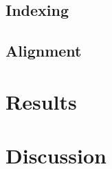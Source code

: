 \documentclass{article}
\begin{document}
\subsection{Indexing}


\subsection{Alignment}


\section{Results}


\section{Discussion}

{}


\end{document}
